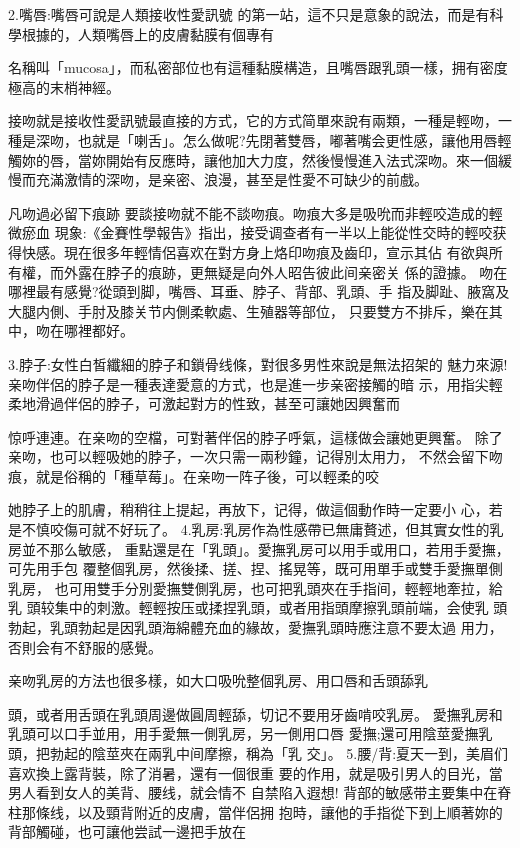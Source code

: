\documentclass[12pt,UTF8]{ctexbook}
\begin{document}
2.嘴唇:嘴唇可說是人類接收性愛訊號
的第一站，這不只是意象的說法，而是有科
學根據的，人類嘴唇上的皮膚黏膜有個專有

名稱叫「mucosa」，而私密部位也有這種黏膜構造，且嘴唇跟乳頭一樣，拥有密度極高的末梢神經。

接吻就是接收性愛訊號最直接的方式，它的方式简單來說有兩類，一種是輕吻，一種是深吻，也就是「喇舌」。怎么做呢?先閉著雙唇，嘟著嘴会更性感，讓他用唇輕觸妳的唇，當妳開始有反應時，讓他加大力度，然後慢慢進入法式深吻。來一個緩慢而充滿激情的深吻，是亲密、浪漫，甚至是性愛不可缺少的前戲。


凡吻過必留下痕跡
要談接吻就不能不談吻痕。吻痕大多是吸吮而非輕咬造成的輕微瘀血
現象:《金賽性學報告》指出，接受调查者有一半以上能從性交時的輕咬获得快感。現在很多年輕情侶喜欢在對方身上烙印吻痕及齒印，宣示其佔
有欲與所有權，而外露在脖子的痕跡，更無疑是向外人昭告彼此间亲密关
係的證據。
吻在哪裡最有感覺?從頭到脚，嘴唇、耳垂、脖子、背部、乳頭、手
指及脚趾、腋窩及大腿内側、手肘及膝关节内側柔軟處、生殖器等部位，
只要雙方不排斥，樂在其中，吻在哪裡都好。

3.脖子:女性白皙纖細的脖子和鎖骨线條，對很多男性來說是無法招架的
魅力來源!亲吻伴侶的脖子是一種表達愛意的方式，也是進一步亲密接觸的暗
示，用指尖輕柔地滑過伴侶的脖子，可激起對方的性致，甚至可讓她因興奮而

惊呼連連。在亲吻的空檔，可對著伴侶的脖子呼氣，這樣做会讓她更興奮。
除了亲吻，也可以輕吸她的脖子，一次只需一兩秒鐘，记得別太用力，
不然会留下吻痕，就是俗稱的「種草莓」。在亲吻一阵子後，可以輕柔的咬

她脖子上的肌膚，稍稍往上提起，再放下，记得，做這個動作時一定要小
心，若是不慎咬傷可就不好玩了。
4.乳房:乳房作為性感帶已無庸贅述，但其實女性的乳房並不那么敏感，
重點還是在「乳頭」。愛撫乳房可以用手或用口，若用手愛撫，可先用手包
覆整個乳房，然後揉、搓、捏、搖晃等，既可用單手或雙手愛撫單側乳房，
也可用雙手分別愛撫雙側乳房，也可把乳頭夾在手指间，輕輕地牽拉，給乳
頭较集中的刺激。輕輕按压或揉捏乳頭，或者用指頭摩擦乳頭前端，会使乳
頭勃起，乳頭勃起是因乳頭海綿體充血的緣故，愛撫乳頭時應注意不要太過
用力，否則会有不舒服的感覺。

亲吻乳房的方法也很多樣，如大口吸吮整個乳房、用口唇和舌頭舔乳

頭，或者用舌頭在乳頭周邊做圓周輕舔，切记不要用牙齒啃咬乳房。
愛撫乳房和乳頭可以口手並用，用手愛無一側乳房，另一側用口唇
愛撫;還可用陰莖愛撫乳頭，把勃起的陰莖夾在兩乳中间摩擦，稱為「乳
交」。
5.腰/背:夏天一到，美眉们喜欢換上露背裝，除了消暑，還有一個很重
要的作用，就是吸引男人的目光，當男人看到女人的美背、腰线，就会情不
自禁陷入遐想!
背部的敏感带主要集中在脊柱那條线，以及頸背附近的皮膚，當伴侶拥
抱時，讓他的手指從下到上順著妳的背部觸碰，也可讓他尝試一邊把手放在
\end{document}
